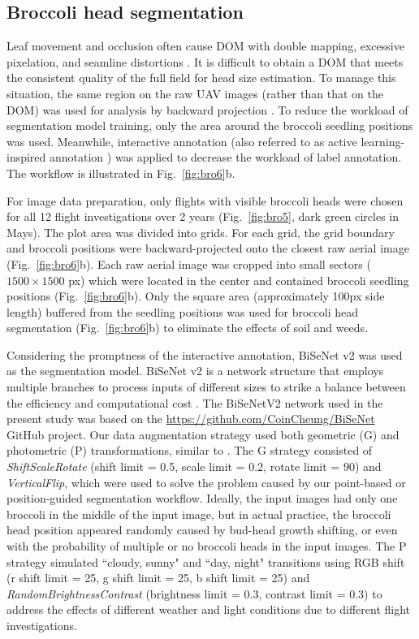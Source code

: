 \subsection{Broccoli head segmentation}

Leaf movement and occlusion often cause DOM with double mapping, excessive pixelation, and seamline distortions \citep{lin_new_2021}. It is difficult to obtain a DOM that meets the consistent quality of the full field for head size estimation. To manage this situation, the same region on the raw UAV images (rather than that on the DOM) was used for analysis by backward projection \citep{wang_easyidp_2021}. To reduce the workload of segmentation model training, only the area around the broccoli seedling positions was used. Meanwhile, interactive annotation (also referred to as active learning-inspired annotation \citep{ghosal_weakly_2019}) was applied to decrease the workload of label annotation. The workflow is illustrated in Fig.~\ref{fig:bro6}b.

For image data preparation, only flights with visible broccoli heads were chosen for all 12 flight investigations over 2 years (Fig.~\ref{fig:bro5}, dark green circles in Mays). The plot area was divided into grids. For each grid, the grid boundary and broccoli positions were backward-projected onto the closest raw aerial image (Fig.~\ref{fig:bro6}b). Each raw aerial image was cropped into small sectors ($1500 \times 1500$ px) which were located in the center and contained broccoli seedling positions (Fig.~\ref{fig:bro6}b). Only the square area (approximately 100px side length) buffered from the seedling positions was used for broccoli head segmentation (Fig.~\ref{fig:bro6}b) to eliminate the effects of soil and weeds.

Considering the promptness of the interactive annotation, BiSeNet v2 \citep{yu_bisenet_2020} was used as the segmentation model. BiSeNet v2 is a network structure that employs multiple branches to process inputs of different sizes to strike a balance between the efficiency and computational cost \citep[Fig.~1]{yu_bisenet_2020}. The BiSeNetV2 network used in the present study was based on the \url{https://github.com/CoinCheung/BiSeNet} GitHub project. Our data augmentation strategy used both geometric (G) and photometric (P) transformations, similar to \citet{blok_effect_2021}. The G strategy consisted of \textit{ShiftScaleRotate} (shift limit = 0.5, scale limit = 0.2, rotate limit = 90) and \textit{VerticalFlip}, which were used to solve the problem caused by our point-based or position-guided segmentation workflow. Ideally, the input images had only one broccoli in the middle of the input image, but in actual practice, the broccoli head position appeared randomly caused by bud-head growth shifting, or even with the probability of multiple or no broccoli heads in the input images. The P strategy simulated ``cloudy, sunny" and ``day, night" transitions using RGB shift (r shift limit = 25, g shift limit = 25, b shift limit = 25) and \textit{RandomBrightnessContrast} (brightness limit = 0.3, contrast limit = 0.3) to address the effects of different weather and light conditions due to different flight investigations.

